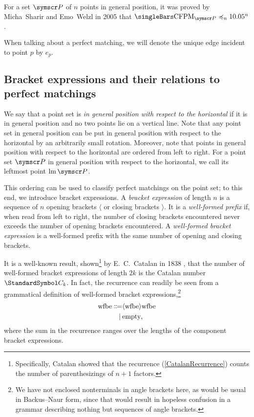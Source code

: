 \documentclass[10pt, a4paper, twoside]{basestyle}
\DeclareMathOperator{\CFPM}{CFPM}
\DeclareMathOperator{\leftmost}{lm}
\newcommand{\CatalanNumber}[1]{\StandardSymbol C_{#1}}
\newcommand{\pointset}{\symscr}
\begin{document}
For a set $\pointset P$ of $n$ points in general position, it was proved by Micha~Sharir and Emo~Welzl in 2005
\cite{SharirWelzl2006} that $\Cardinality{\CFPM_{\pointset P}} \preccurlyeq_n 10.05^n$.

When talking about a perfect matching, we will denote the unique edge incident to point $p$ by
$e_p$.

\subsection{Bracket expressions and their relations to perfect matchings}

We say that a point set is \emph{in general position with respect to the horizontal} if it
is in general position and no two points lie on a vertical line. Note that any point set in
general position can be put in general position with respect to the horizontal by an arbitrarily
small rotation. Moreover, note that points in general position with respect to the horizontal
are ordered from left to right.
For a point set $\pointset P$ in general position with respect to the horizontal, we call its
leftmost point $\leftmost\pointset P$.

This ordering can be used to classify perfect matchings on the point set; to this end,
we introduce bracket expressions.
A \emph{bracket expression} of length $n$ is a sequence of $n$ opening brackets $\langle$ or closing
brackets $\rangle$.
It is a \emph{well-formed prefix} if, when read from left to right, the number of closing brackets
encountered never exceeds the number of opening brackets encountered.
A \emph{well-formed bracket expression} is a well-formed prefix with the same number of opening and
closing brackets.

It is a well-known result, shown\footnote{Specifically, Catalan showed that the recurrence (\ref{CatalanRecurrence})
counts the number of parenthesizings of $n+1$ factors.} by E.~C.~Catalan in 1838 \cite{Catalan1838}, that the
number of well-formed bracket expressions
of length $2k$ is the Catalan number $\CatalanNumber k$. In fact, the recurrence can readily be seen from
a grammatical definition of well-formed bracket expressions,\footnote{We have not enclosed nonterminals
in angle brackets here, as would be usual in Backus--Naur form, since that would result in hopeless
confusion in a grammar describing nothing but sequences of angle brackets.}\begin{align*}
\text{wfbe} \Coloneq
& \langle \text{wfbe} \rangle \text{wfbe} \\
\mid\: & \text{empty}\text,
\end{align*}
where the sum in the recurrence ranges over the lengths of the component bracket expressions.
\end{document}
